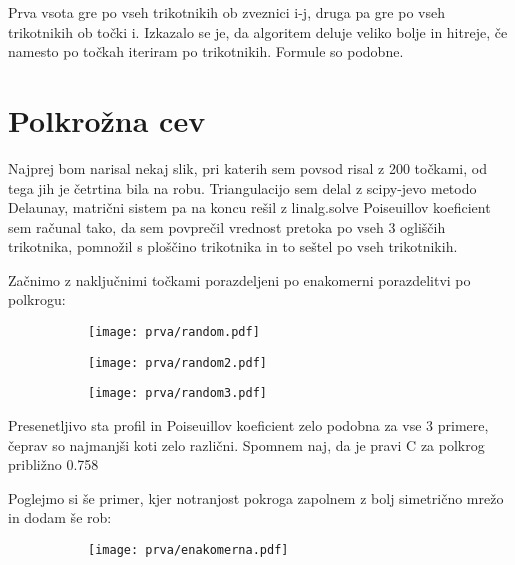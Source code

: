 \documentclass{article}
\begin{document}
Prva vsota gre po vseh trikotnikih ob zveznici i-j, druga pa gre po vseh trikotnikih ob točki i.
Izkazalo se je, da algoritem deluje veliko bolje in hitreje, če namesto po točkah iteriram po trikotnikih. Formule so podobne.


\section{Polkrožna cev}

Najprej bom narisal nekaj slik, pri katerih sem povsod risal z 200 točkami, od tega jih je četrtina bila na robu. Triangulacijo sem delal z scipy-jevo metodo Delaunay, matrični sistem pa na koncu rešil z linalg.solve
Poiseuillov koeficient sem računal tako, da sem povprečil vrednost pretoka po vseh 3 ogliščih trikotnika, pomnožil s ploščino trikotnika in to seštel po vseh trikotnikih.

Začnimo z naključnimi točkami porazdeljeni po enakomerni porazdelitvi po polkrogu:

\begin{figure}[H]
\centering
\begin{subfigure}{\textwidth}
\texttt{[image: prva/random.pdf]}
\end{subfigure}
\caption*{}
\end{figure}

\begin{figure}[H]
\centering
\begin{subfigure}{\textwidth}
\texttt{[image: prva/random2.pdf]}
\end{subfigure}
\caption*{}
\end{figure}

\begin{figure}[H]
\centering
\begin{subfigure}{\textwidth}
\texttt{[image: prva/random3.pdf]}
\end{subfigure}
\caption*{}
\end{figure}

Presenetljivo sta profil in Poiseuillov koeficient zelo podobna za vse 3 primere, čeprav so najmanjši koti zelo različni. Spomnem naj, da je pravi C za polkrog približno 0.758


Poglejmo si še primer, kjer notranjost pokroga zapolnem z bolj simetrično mrežo in dodam še rob:

\begin{figure}[H]
\centering
\begin{subfigure}{\textwidth}
\texttt{[image: prva/enakomerna.pdf]}
\end{subfigure}
\caption*{}
\end{figure}
\end{document}
